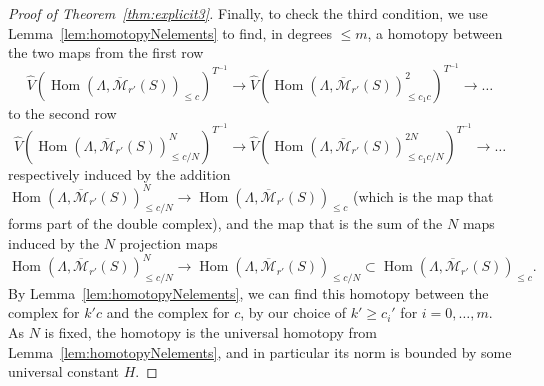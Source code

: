 \documentclass[11pt]{amsbook}
\DeclareMathOperator{\Hom}{Hom}
\numberwithin{equation}{section}
\numberwithin{theorem}{section}
\theoremstyle{definition}
\begin{document}
\begin{proof}[Proof of Theorem~\ref{thm:explicit3}]
Finally, to check the third condition, we use Lemma~\ref{lem:homotopyNelements} to find, in degrees $\leq m$, a homotopy between the two maps from the first row
\[
\widehat{V}(\Hom(\Lambda,\overline{\mathcal M}_{r'}(S))_{\leq c})^{T^{-1}}\to \widehat{V}(\Hom(\Lambda,\overline{\mathcal M}_{r'}(S))_{\leq c_1c}^2)^{T^{-1}}\to \ldots
\]
to the second row
\[
\widehat{V}(\Hom(\Lambda,\overline{\mathcal M}_{r'}(S))_{\leq c/N}^N)^{T^{-1}}\to \widehat{V}(\Hom(\Lambda,\overline{\mathcal M}_{r'}(S))_{\leq c_1c/N}^{2N})^{T^{-1}}\to \ldots
\]
respectively induced by the addition $\Hom(\Lambda,\overline{\mathcal M}_{r'}(S))_{\leq c/N}^N\to \Hom(\Lambda,\overline{\mathcal M}_{r'}(S))_{\leq c}$ (which is the map that forms part of the double complex), and the map that is the sum of the $N$ maps induced by the $N$ projection maps
\[
\Hom(\Lambda,\overline{\mathcal M}_{r'}(S))_{\leq c/N}^N\to \Hom(\Lambda,\overline{\mathcal M}_{r'}(S))_{\leq c/N}\subset \Hom(\Lambda,\overline{\mathcal M}_{r'}(S))_{\leq c}.
\]
By Lemma~\ref{lem:homotopyNelements}, we can find this homotopy between the complex for $k'c$ and the complex for $c$, by our choice of $k'\geq c_i'$ for $i=0,\ldots,m$. As $N$ is fixed, the homotopy is the universal homotopy from Lemma~\ref{lem:homotopyNelements}, and in particular its norm is bounded by some universal constant $H$.


\end{proof}
\end{document}
